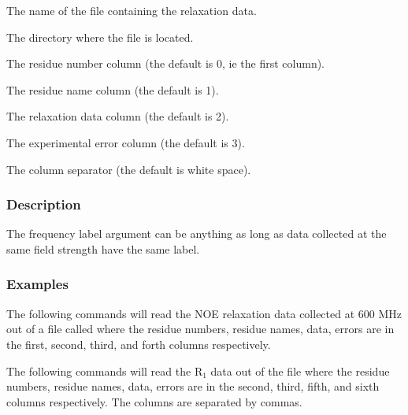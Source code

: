   The name of the file containing the relaxation data. 

  The directory where the file is located. 

  The residue number column (the default is 0, ie the first column). 

  The residue name column (the default is 1). 

  The relaxation data column (the default is 2). 

  The experimental error column (the default is 3). 

  The column separator (the default is white space). 




\subsubsection{Description}

The frequency label argument can be anything as long as data collected at the same field strength have the same label.



\subsubsection{Examples}

The following commands will read the NOE relaxation data collected at 600 MHz out of a file called  where the residue numbers, residue names, data, errors are in the first, second, third, and forth columns respectively.




The following commands will read the R$_1$ data out of the file  where the residue numbers, residue names, data, errors are in the second, third, fifth, and sixth columns respectively.  The columns are separated by commas.





